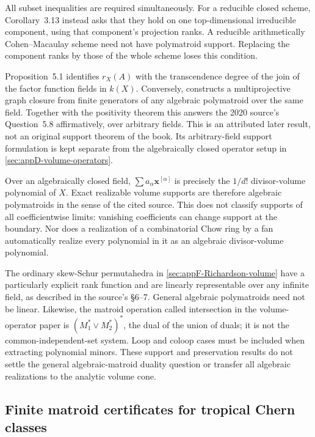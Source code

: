 All subset inequalities are required simultaneously. For a reducible
closed scheme, Corollary~3.13 instead asks that they hold on
one top-dimensional irreducible component, using that component's
projection ranks. A reducible arithmetically Cohen--Macaulay scheme
need not have polymatroid support. Replacing the component ranks
by those of the whole scheme loses this condition.

Proposition~5.1 identifies $r_X(A)$ with the transcendence degree
of the join of the factor function fields in $k(X)$. Conversely,
\cite[Proposition~5.4]{GrundHuhMichalekSuessWang25VolumeV1}
constructs a multiprojective graph closure from finite generators
of any algebraic polymatroid over the same field. Together with
the positivity theorem this answers the 2020 source's
Question~5.8 affirmatively, over arbitrary fields. This is an
attributed later result, not an original support theorem of the book.
Its arbitrary-field support formulation is kept separate from
the algebraically closed operator setup in
\cref{sec:appD-volume-operators}.

Over an algebraically closed field,
$\sum a_\alpha\mathbf x^{[\alpha]}$ is precisely the
$1/d!$ divisor-volume polynomial of $X$. Exact realizable
volume supports are therefore algebraic polymatroids in the
sense of the cited source. This does not classify supports of
all coefficientwise limits: vanishing coefficients can change
support at the boundary. Nor does a realization of a combinatorial
Chow ring by a fan automatically realize every polynomial in it
as an algebraic divisor-volume polynomial.

The ordinary skew-Schur permutahedra in
\cref{sec:appF-Richardson-volume} have a particularly explicit
rank function and are linearly representable over any infinite
field, as described in the source's \S6--7. General algebraic
polymatroids need not be linear. Likewise, the matroid operation
called intersection in the volume-operator paper is
$(M_1^*\vee M_2^*)^*$, the dual of the union of duals; it is
not the common-independent-set system. Loop and coloop cases
must be included when extracting polynomial minors.
These support and preservation results do not settle the general
algebraic-matroid duality question or transfer all algebraic
realizations to the analytic volume cone.

\subsection{Finite matroid certificates for tropical Chern classes}
\label{sec:appG-tropical-Chern-certificates}

